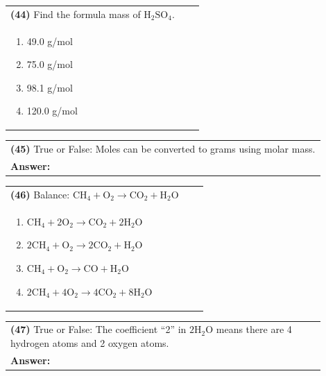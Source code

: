 \documentclass{article}
\begin{document}
\vspace{0.2cm}
\noindent \begin{tabular}{|p{0.9\linewidth}|}
\hline
\vspace{0.2cm}
\textbf{(44)} Find the formula mass of $\mathrm{H_2SO_4}$.\\
\begin{minipage}[t]{0.85\linewidth}
\begin{enumerate}[label=\alph*.]
\item 49.0 g/mol
\item 75.0 g/mol
\item 98.1 g/mol
\item 120.0 g/mol
\end{enumerate}
\end{minipage}\\
\hline
\end{tabular}
\newpage

\vspace{0.2cm}
\noindent \begin{tabular}{|p{0.9\linewidth}|}
\hline
\vspace{0.2cm}
\textbf{(45)} True or False: Moles can be converted to grams using molar mass.\\
\textbf{Answer:} \underline{\hspace{2cm}}\\
\hline
\end{tabular}

\vspace{0.2cm}
\noindent \begin{tabular}{|p{0.9\linewidth}|}
\hline
\vspace{0.2cm}
\textbf{(46)} Balance: $\mathrm{CH_4 + O_2 \rightarrow CO_2 + H_2O}$\\
\begin{minipage}[t]{0.85\linewidth}
\begin{enumerate}[label=\alph*.]
\item $\mathrm{CH_4 + 2O_2 \rightarrow CO_2 + 2H_2O}$
\item $\mathrm{2CH_4 + O_2 \rightarrow 2CO_2 + H_2O}$
\item $\mathrm{CH_4 + O_2 \rightarrow CO + H_2O}$
\item $\mathrm{2CH_4 + 4O_2 \rightarrow 4CO_2 + 8H_2O}$
\end{enumerate}
\end{minipage}\\
\hline
\end{tabular}

\vspace{0.2cm}
\noindent \begin{tabular}{|p{0.9\linewidth}|}
\hline
\vspace{0.2cm}
\textbf{(47)} True or False: The coefficient ``2'' in $2\mathrm{H_2O}$ means there are 4 hydrogen atoms and 2 oxygen atoms.\\
\textbf{Answer:} \underline{\hspace{2cm}}\\
\hline
\end{tabular}
\end{document}
